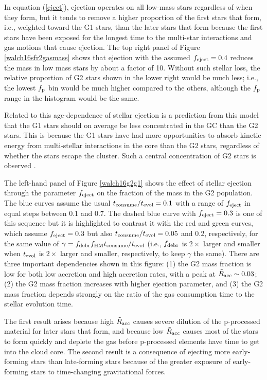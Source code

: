 \documentclass[12pt,preprint]{aastex}
\begin{document}
In equation (\ref{eject}), ejection operates on all low-mass stars regardless of
when they form, but it tends to remove a higher proportion of the first stars that
form, i.e., weighted toward the G1 stars, than the later stars that form because
the first stars have been exposed for the longest time to the multi-star
interactions and gas motions that cause ejection. The top right panel of Figure
\ref{walch16sfr2gasmass} shows that ejection with the assumed $f_{\rm eject}=0.4$
reduces the mass in low mass stars by about a factor of 10. Without such stellar
loss, the relative proportion of G2 stars shown in the lower right would be much
less; i.e., the lowest $f_{\rm p}$ bin would be much higher compared to the others,
although the $f_{\rm p}$ range in the histogram would be the same.

Related to this age-dependence of stellar ejection is a prediction from this model
that the G1 stars should on average be less concentrated in the GC than the G2
stars. This is because the G1 stars have had more opportunities to absorb kinetic
energy from multi-stellar interactions in the core than the G2 stars, regardless of
whether the stars escape the cluster.  Such a central concentration of G2 stars is
observed \citep{gratton12}.

The left-hand panel of Figure \ref{walch16g2g1} shows the effect of stellar
ejection through the parameter $f_{\rm eject}$ on the fraction of the mass in the
G2 population.  The blue curves assume the usual $t_{\rm consume}/t_{\rm evol}=0.1$
with a range of $f_{\rm eject}$ in equal steps between 0.1 and 0.7. The dashed blue
curve with $f_{\rm eject}=0.3$ is one of this sequence but it is highlighted to
contrast it with the red and green curves, which assume $f_{\rm eject}=0.3$ but
also $t_{\rm consume}/t_{\rm evol}=0.05$ and 0.2, respectively, for the same value
of $\gamma=f_{\rm debr}f_{\rm HM}t_{\rm consume}/t_{\rm evol}$ (i.e., $f_{\rm
debr}$ is $2\times$ larger and smaller when $t_{\rm evol}$ is $2\times$ larger and
smaller, respectively, to keep $\gamma$ the same). There are three important
dependencies shown in this figure: (1) the G2 mass fraction is low for both low
accretion and high accretion rates, with a peak at ${\tilde R}_{\rm acc}\sim0.03$;
(2) the G2 mass fraction increases with higher ejection parameter, and (3) the G2
mass fraction depends strongly on the ratio of the gas consumption time to the
stellar evolution time.

The first result arises because high ${\tilde R}_{\rm acc}$ causes severe dilution
of the p-processed material for later stars that form, and because low ${\tilde
R}_{\rm acc}$ causes most of the stars to form quickly and deplete the gas before
p-processed elements have time to get into the cloud core. The second result is a
consequence of ejecting more early-forming stars than late-forming stars because of
the greater exposure of early-forming stars to time-changing gravitational forces.
\end{document}
